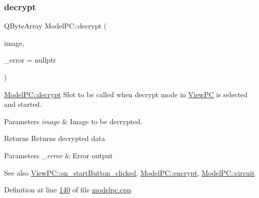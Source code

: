 \subsubsection{\texorpdfstring{decrypt}{decrypt}}
{\footnotesize\ttfamily Q\+Byte\+Array Model\+P\+C\+::decrypt (\begin{DoxyParamCaption}\item[{Q\+Image $\ast$}]{image,  }\item[{Q\+String $\ast$}]{\+\_\+error = {\ttfamily nullptr} }\end{DoxyParamCaption})\hspace{0.3cm}{\ttfamily [slot]}}



\mbox{\hyperlink{class_model_p_c_af1f0b21565bf39808c4cdd448fad0ea8}{Model\+P\+C\+::decrypt}} Slot to be called when decrypt mode in \mbox{\hyperlink{class_view_p_c}{View\+PC}} is selected and started. 


\begin{DoxyParams}{Parameters}
{\em image} & Image to be decrypted. \\
\hline
\end{DoxyParams}
\begin{DoxyReturn}{Returns}
Returns decrypted data 
\end{DoxyReturn}

\begin{DoxyParams}{Parameters}
{\em \+\_\+error} & Error output \\
\hline
\end{DoxyParams}
\begin{DoxySeeAlso}{See also}
\mbox{\hyperlink{class_view_p_c_a456d75b7c5d3a089302a576e7359f1f4}{View\+P\+C\+::on\+\_\+start\+Button\+\_\+clicked}}, \mbox{\hyperlink{class_model_p_c_a8ef76567bc0c0307b4e2547c46536e51}{Model\+P\+C\+::encrypt}}, \mbox{\hyperlink{class_model_p_c_a1d0091062a0c836b283ec2f67411623b}{Model\+P\+C\+::circuit}} 
\end{DoxySeeAlso}


Definition at line \mbox{\hyperlink{modelpc_8cpp_source_l00140}{140}} of file \mbox{\hyperlink{modelpc_8cpp_source}{modelpc.\+cpp}}.

